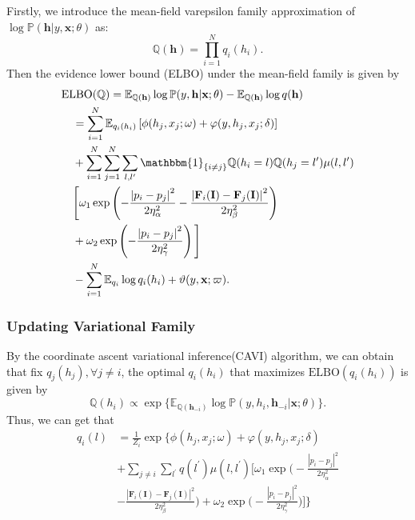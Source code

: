 \documentclass[conference]{IEEEtran}
\newcommand{\EE}{{\mathbb{E}}}
\newcommand{\PP}{{\mathbb{P}}}
\newcommand{\QQ}{{\mathbb{Q}}}
\newcommand{\Fb}{\mathbf{F}}
\newcommand{\Ib}{\mathbf{I}}
\newcommand{\hb}{\mathbf{h}}
\newcommand{\xb}{\mathbf{x}}
\newcommand{\one}{\mathbbm{1}}
\begin{document}
Firstly, we introduce the mean-field varepsilon family approximation of
$\log\PP(\hb \vert y, \xb; \theta)$ as:
\begin{equation*}
\QQ(\hb) = \prod_{i=1}^N q_i(h_i).
\end{equation*}
Then the evidence lower bound (ELBO) under the mean-field family is given by
\begin{equation}
\begin{split}
& \textrm{ELBO}(\QQ) = \EE_{\QQ(\hb)} \log\PP(y, \hb \vert \xb; \theta)
- \EE_{\QQ(\hb)} \log q(\hb) \\
&\quad = \sum_{i=1}^N \EE_{q_i(h_i)}
\left[ \phi(h_j, x_j; \omega) + \varphi(y, h_j, x_j; \delta) \right] \\
&\quad + \sum_{i=1}^N \sum_{j=1}^N \sum_{l,l^\prime} \one_{\{i \neq j\}} 
\QQ(h_i = l) \QQ(h_j = l^\prime) \mu(l, l^\prime) \\
&\quad \Bigg[ \omega_1 \exp \left(
- \frac{\left\lvert p_i - p_j \right\rvert^2}{2\eta_\alpha^2}
- \frac{\left\lvert \Fb_i(\Ib) - \Fb_j(\Ib) \right\rvert^2}{2\eta_\beta^2}
\right) \\
&\quad + \omega_2 \exp \left(
- \frac{\left\lvert p_i - p_j \right\rvert^2}{2\eta_\gamma^2}
\right) \Bigg] \\
&\quad - \sum_{i=1}^N \EE_{q_i} \log q_i(h_i) + \vartheta(y, \xb; \varpi).
\end{split}
\end{equation}


\subsubsection{Updating Variational Family}


By the coordinate ascent variational inference(CAVI) algorithm,
we can obtain that fix $q_j(h_j), \forall j \neq i$, the optimal $q_i(h_i)$
that maximizes $\textrm{ELBO}(q_i(h_i))$ is given by
\begin{equation}
\QQ(h_i) \propto \exp\{\EE_{\QQ(\hb_{-i})}
\log\PP(y, h_i, \hb_{-i} \vert \xb; \theta)\}.
\end{equation}
Thus, we can get that
\begin{equation}
\begin{split}
q_i(l) &= \frac{1}{Z_i} \exp \Bigg\{
\phi(h_j, x_j; \omega) + \varphi(y, h_j, x_j; \delta) \\
&+ \sum_{j \neq i} \sum_{l^\prime} q(l^\prime) \mu(l, l^\prime) 
\Bigg[ \omega_1 \exp \big(
- \frac{\left\lvert p_i - p_j \right\rvert^2}{2\eta_\alpha^2}\\
&- \frac{\left\lvert \Fb_i(\Ib) - \Fb_j(\Ib) \right\rvert^2}{2\eta_\beta^2}
\big)
+ \omega_2 \exp \big(
- \frac{\left\lvert p_i - p_j 
\right\rvert^2}{2\eta_\gamma^2}
\big)
\Bigg]
\Bigg\}
\end{split}
\end{equation}
\end{document}
